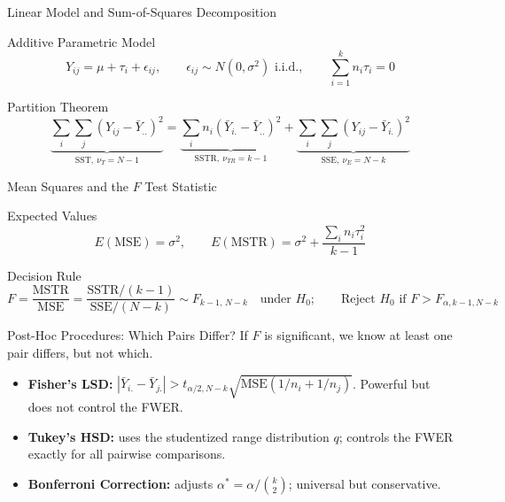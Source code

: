 \documentclass[10pt, aspectratio=169]{beamer}
\begin{document}
\begin{frame}{Linear Model and Sum-of-Squares Decomposition}
  \footnotesize
  \begin{block}{Additive Parametric Model}
    $$Y_{ij} = \mu + \tau_i + \epsilon_{ij}, \qquad \epsilon_{ij}\sim N(0,\sigma^2) \text{ i.i.d.}, \qquad \sum_{i=1}^k n_i\tau_i = 0$$
  \end{block}
  \pause

  \vspace{0.1cm}
  \begin{alertblock}{Partition Theorem}
    $$\underbrace{\sum_i\sum_j (Y_{ij}-\bar Y_{..})^2}_{\text{SST},\ \nu_T=N-1} = \underbrace{\sum_i n_i(\bar Y_{i.}-\bar Y_{..})^2}_{\text{SSTR},\ \nu_{TR}=k-1} + \underbrace{\sum_i\sum_j (Y_{ij}-\bar Y_{i.})^2}_{\text{SSE},\ \nu_E=N-k}$$
  \end{alertblock}
\end{frame}

\begin{frame}{Mean Squares and the $F$ Test Statistic}
  \footnotesize
  \begin{block}{Expected Values}
    $$E(\text{MSE})=\sigma^2, \qquad E(\text{MSTR}) = \sigma^2 + \frac{\sum_i n_i\tau_i^2}{k-1}$$
  \end{block}
  \pause

  \vspace{0.1cm}
  \begin{alertblock}{Decision Rule}
    $$F = \frac{\text{MSTR}}{\text{MSE}} = \frac{\text{SSTR}/(k-1)}{\text{SSE}/(N-k)} \sim F_{k-1,\,N-k} \quad\text{under } H_0; \qquad \text{Reject } H_0 \text{ if } F>F_{\alpha,k-1,N-k}$$
  \end{alertblock}
\end{frame}

\begin{frame}{Post-Hoc Procedures: Which Pairs Differ?}
  \footnotesize
  If $F$ is significant, we know at least one pair differs, but not which. \pause
  \begin{itemize}\itemsep=0.1cm
    \item \textbf{Fisher's LSD:} $|\bar Y_{i.}-\bar Y_{j.}| > t_{\alpha/2,N-k}\sqrt{\text{MSE}(1/n_i+1/n_j)}$. Powerful but does not control the FWER. \pause
    \item \textbf{Tukey's HSD:} uses the studentized range distribution $q$; controls the FWER exactly for all pairwise comparisons. \pause
    \item \textbf{Bonferroni Correction:} adjusts $\alpha^* = \alpha/\binom{k}{2}$; universal but conservative.
  \end{itemize}
\end{frame}
\end{document}
